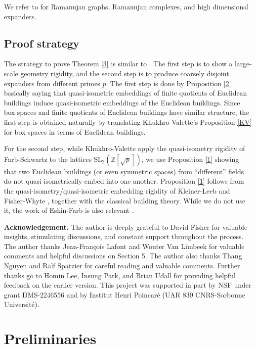 \documentclass[letterpaper, reqno, 11pt]{amsart}
\theoremstyle{definition}
\theoremstyle{definition}
\theoremstyle{remark}
\begin{document}
We refer to \cite{lubotzky2014ramanujan, lubotzky2018high, lubotzky2020ramanujan} for Ramanujan graphs, Ramanujan complexes, and high dimensional expanders.

\subsection{Proof strategy}
The strategy to prove Theorem \ref{3} is similar to  \cite{khukhro2017expanders}. The first step is to show a large-scale geometry rigidity, and the second step is to produce coarsely disjoint expanders from different primes $p$.
The first step is done by Proposition \ref{2} basically
saying that quasi-isometric embeddings of finite quotients of Euclidean buildings induce quasi-isometric embeddings of the Euclidean buildings. Since box spaces and finite quotients of Euclidean buildings have similar structure, the first step is obtained naturally by translating Khukhro-Valette's Proposition \ref{KV} for box spaces in terms of Euclidean buildings.



For the second step, while Khukhro-Valette apply the quasi-isometry rigidity of Farb-Schwartz to the lattices $\mathrm{SL}_2(\mathbb{Z}[\sqrt{p}]) $\cite{farb1996large}, we use Proposition \ref{1} 
showing that two Euclidean buildings (or even symmetric spaces) from ``different'' fields do not quasi-isometrically embed into one another. Proposition \ref{1} follows from the quasi-isometry/quasi-isometric embedding rigidity of
Kleiner-Leeb and Fisher-Whyte \cite{kleiner1997rigidity}, \cite{fisher2018quasi} together with the classical building theory. While we do not use it, the work of Eskin-Farb is also relevant \cite{eskin1997quasi}.


\medskip 
\textbf{Acknowledgement.} The author is deeply grateful to David Fisher for valuable insights, stimulating discussions, and constant support throughout the process. The author thanks Jean-François Lafont and Wouter Van Limbeek for valuable comments and helpful discussions on Section 5. 
The author also thanks Thang Nguyen and Ralf Spatzier for careful reading and valuable comments. Further thanks go to Homin Lee, Insung Park, and Brian Udall for providing helpful feedback on the earlier version. This project was supported in part by NSF under grant DMS-2246556 and by Institut Henri Poincaré (UAR 839 CNRS-Sorbonne Université).

\section{Preliminaries}
\end{document}
